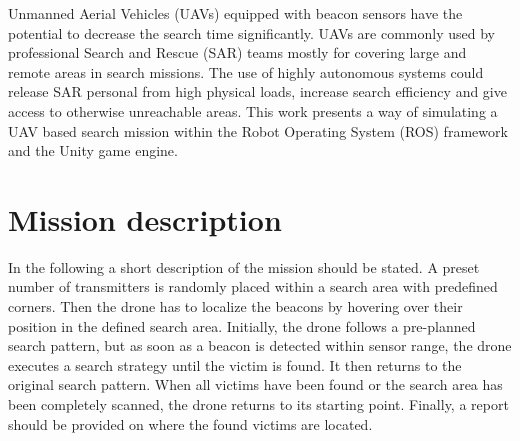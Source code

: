 \documentclass[conference]{IEEEtran}
\begin{document}
Unmanned Aerial Vehicles (UAVs) equipped with beacon sensors have the potential to decrease the search time significantly. UAVs are commonly used by professional Search and Rescue (SAR) teams mostly for covering large and remote areas in search missions. The use of highly autonomous systems could release SAR personal from high physical loads, increase search efficiency and give access to otherwise unreachable areas. This work presents a way of simulating a UAV based search mission within the Robot Operating System (ROS) framework and the Unity game engine. 

\section{Mission description}
In the following a short description of the mission should be stated. A preset number of transmitters is randomly placed within a search area with predefined corners. Then the drone has to localize the beacons by hovering over their position in the defined search area. Initially, the drone follows a pre-planned search pattern, but as soon as a beacon is detected within sensor range, the drone executes a search strategy until the victim is found. It then returns to the original search pattern. When all victims have been found or the search area has been completely scanned, the drone returns to its starting point. Finally, a report should be provided on where the found victims are located.
\end{document}
